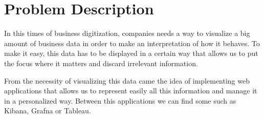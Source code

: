 \documentclass[a4paper, 12pt, english]{book}
\begin{document}
\section{Problem Description}
\label{sec:description}

In this times of business digitization, companies needs a way to visualize a big amount of business data in order to make an interpretation of how it behaves. To make it easy, this data has to be displayed in a certain way that allows us to put the focus where it matters and discard irrelevant information.

From the necessity of visualizing this data came the idea of implementing web applications that allows us to represent easily all this information and manage it in a personalized way. Between this applications we can find some such as Kibana, Grafna or Tableau.







\end{document}
